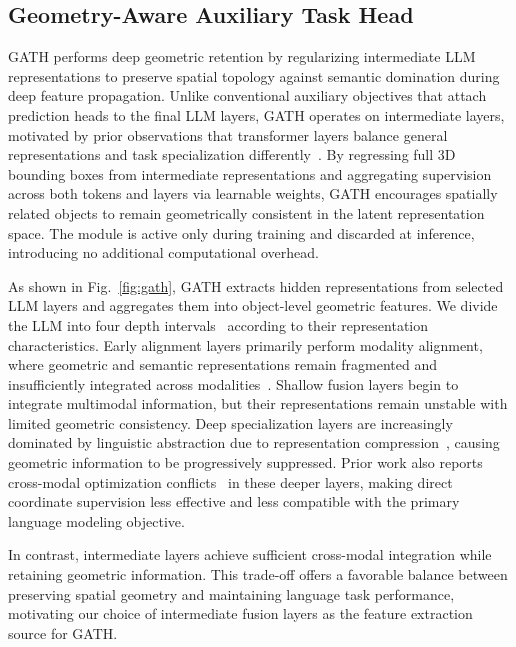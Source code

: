 \documentclass[lettersize,journal]{IEEEtran}
\begin{document}
\subsection{Geometry-Aware Auxiliary Task Head}

GATH performs deep geometric retention by regularizing intermediate LLM representations to preserve spatial topology against semantic domination during deep feature propagation. Unlike conventional auxiliary objectives that attach prediction heads to {the final LLM layers}, GATH operates on intermediate layers, motivated by prior observations that transformer layers balance general representations and task specialization differently~\cite{liu2019linguistic,voita2019bottom}. By regressing full 3D bounding boxes from intermediate representations and aggregating supervision across both tokens and layers via learnable weights, {GATH encourages spatially related objects to remain geometrically consistent in the latent representation space}. The module is active only during training and discarded at inference, introducing no additional computational overhead.

As shown in Fig.~\ref{fig:gath}, GATH extracts hidden representations from selected LLM layers and aggregates them into object-level geometric features. We divide the LLM into four depth intervals~\cite{yu&lee2025} according to their representation characteristics. Early alignment layers primarily perform modality alignment, where geometric and semantic representations remain fragmented and insufficiently integrated across modalities~\cite{chang2026}. Shallow fusion layers begin to integrate multimodal information, but their representations remain unstable with limited geometric consistency. Deep specialization layers are increasingly dominated by linguistic abstraction due to representation compression~\cite{chang2026}, causing geometric information to be progressively suppressed. Prior work also reports cross-modal optimization conflicts~\cite{hao2026} in these deeper layers, making direct coordinate supervision less effective and less compatible with the primary language modeling objective.

In contrast, intermediate layers achieve sufficient cross-modal integration while retaining geometric information. This trade-off offers a favorable balance between preserving spatial geometry and maintaining language task performance, motivating our choice of intermediate {fusion} layers as the feature extraction source for GATH.


\end{document}
